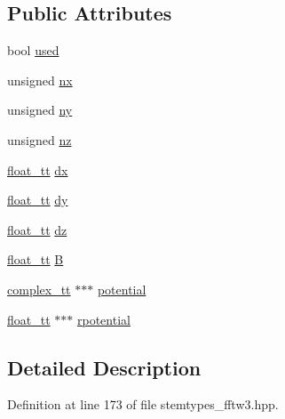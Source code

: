 \subsection*{Public Attributes}
\begin{DoxyCompactItemize}
\item 
bool \hyperlink{struct_q_s_t_e_m_1_1atom_box_struct_ae6ee2f85a1cb977d392cbbdb5fabcdf4}{used}
\item 
unsigned \hyperlink{struct_q_s_t_e_m_1_1atom_box_struct_afd8dc9d068225a984970806988bf6995}{nx}
\item 
unsigned \hyperlink{struct_q_s_t_e_m_1_1atom_box_struct_a36232f5fc60ab2ef6ec7af084d805b89}{ny}
\item 
unsigned \hyperlink{struct_q_s_t_e_m_1_1atom_box_struct_a26dc3381f5a257af76831a8db911be40}{nz}
\item 
\hyperlink{namespace_q_s_t_e_m_a915d7caa497280d9f927c4ce8d330e47}{float\-\_\-tt} \hyperlink{struct_q_s_t_e_m_1_1atom_box_struct_a9c69c6f57952718e196185a37510c066}{dx}
\item 
\hyperlink{namespace_q_s_t_e_m_a915d7caa497280d9f927c4ce8d330e47}{float\-\_\-tt} \hyperlink{struct_q_s_t_e_m_1_1atom_box_struct_a326ce8d29e57e2a02cf4fa833bcb577c}{dy}
\item 
\hyperlink{namespace_q_s_t_e_m_a915d7caa497280d9f927c4ce8d330e47}{float\-\_\-tt} \hyperlink{struct_q_s_t_e_m_1_1atom_box_struct_add07ac6b767c04bb5dc4d64636200ac4}{dz}
\item 
\hyperlink{namespace_q_s_t_e_m_a915d7caa497280d9f927c4ce8d330e47}{float\-\_\-tt} \hyperlink{struct_q_s_t_e_m_1_1atom_box_struct_ae6916aa8e23a249f4181ec7d630c9398}{B}
\item 
\hyperlink{namespace_q_s_t_e_m_afa320ea3cd2f5ff080c422f81b803a32}{complex\-\_\-tt} $\ast$$\ast$$\ast$ \hyperlink{struct_q_s_t_e_m_1_1atom_box_struct_a9757097504066a098b30326d79cdfa7e}{potential}
\item 
\hyperlink{namespace_q_s_t_e_m_a915d7caa497280d9f927c4ce8d330e47}{float\-\_\-tt} $\ast$$\ast$$\ast$ \hyperlink{struct_q_s_t_e_m_1_1atom_box_struct_a1a5104f1a57b81c4e5f4c26df3f271b3}{rpotential}
\end{DoxyCompactItemize}


\subsection{Detailed Description}


Definition at line 173 of file stemtypes\-\_\-fftw3.\-hpp.



